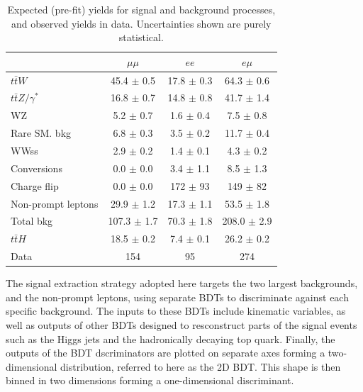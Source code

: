 \begin{table}[htbp]
\begin{center}
  \caption[Signal region event yields by lepton flavor]{Expected (pre-fit) yields for signal and background processes, and observed yields in data. Uncertainties shown
are purely statistical.}
    \begin{tabular}{l c c c} \hline
& $\mu\mu$ & $ee$ & $e\mu$  \\ \hline 
$t\bar{t}W$ & 45.4 $\pm$ 0.5 & 17.8 $\pm$ 0.3 & 64.3 $\pm$ 0.6 \\
$t\bar{t}Z/\gamma^{*}$ & 16.8 $\pm$ 0.7 & 14.8 $\pm$ 0.8 & 41.7 $\pm$ 1.4 \\
\hline
WZ & 5.2 $\pm$ 0.7 & 1.6 $\pm$ 0.4 & 7.5 $\pm$ 0.8 \\
Rare SM. bkg & 6.8 $\pm$ 0.3 & 3.5 $\pm$ 0.2 & 11.7 $\pm$ 0.4 \\
WWss & 2.9 $\pm$ 0.2 & 1.4 $\pm$ 0.1 & 4.3 $\pm$ 0.2 \\
\hline
Conversions & 0.0 $\pm$ 0.0 & 3.4 $\pm$ 1.1 & 8.5 $\pm$ 1.3 \\
Charge flip & 0.0 $\pm$ 0.0 & 172 $\pm$ 93 & 149 $\pm$ 82 \\
Non-prompt leptons & 29.9 $\pm$ 1.2 & 17.3 $\pm$ 1.1 & 53.5 $\pm$ 1.8 \\
\hline
Total bkg & 107.3 $\pm$ 1.7 & 70.3 $\pm$ 1.8 & 208.0 $\pm$ 2.9 \\
 \hline
$t\bar{t}H$ & 18.5 $\pm$ 0.2 & 7.4 $\pm$ 0.1 & 26.2 $\pm$ 0.2 \\
 \hline
Data & 154 & 95 & 274 \\
\hline
\end{tabular}
    \label{tab:yields}
\end{center}
\end{table}

The signal extraction strategy adopted here targets the two largest backgrounds, \ttv and the non-prompt leptons, using separate BDTs to discriminate against each
specific background. The inputs to these BDTs include kinematic variables, as well as outputs of other BDTs designed to resconstruct parts of the signal
events such as the Higgs jets and the hadronically decaying top quark. Finally, the outputs of the BDT dscriminators are plotted on separate axes forming a two-dimensional
distribution, referred to here as the 2D BDT. This shape is then binned in two dimensions forming a one-dimensional discriminant. 

